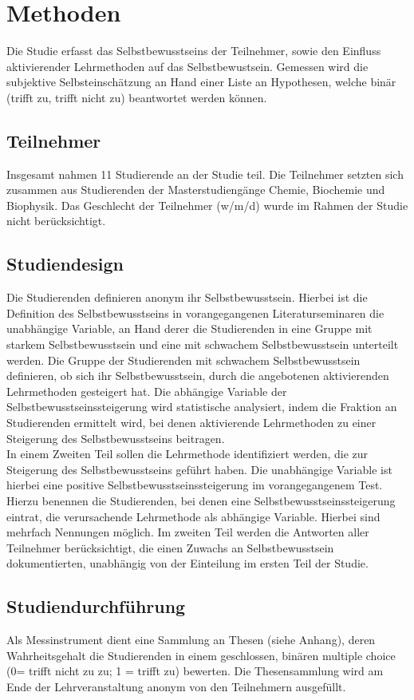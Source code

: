 \section{Methoden}
Die Studie erfasst das Selbstbewusstseins der Teilnehmer, sowie den Einfluss aktivierender Lehrmethoden auf das Selbstbewustsein. Gemessen wird die subjektive Selbsteinschätzung an Hand einer Liste an Hypothesen, welche binär (trifft zu, trifft nicht zu) beantwortet werden können.

\subsection{Teilnehmer}
Insgesamt nahmen 11 Studierende an der Studie teil. Die Teilnehmer setzten sich zusammen aus Studierenden der Masterstudiengänge Chemie, Biochemie und Biophysik. Das Geschlecht der Teilnehmer (w/m/d) wurde im Rahmen der Studie nicht berücksichtigt.

\subsection{Studiendesign}
Die Studierenden definieren anonym ihr Selbstbewusstsein. Hierbei ist die Definition des Selbstbewusstseins in vorangegangenen Literaturseminaren die unabhängige Variable, an Hand derer die Studierenden in eine Gruppe mit starkem Selbstbewusstsein und eine mit schwachem Selbstbewusstsein unterteilt werden. Die Gruppe der Studierenden mit schwachem Selbstbewusstsein definieren, ob sich ihr Selbstbewusstsein, durch die angebotenen aktivierenden Lehrmethoden gesteigert hat. Die abhängige Variable der Selbstbewusstseinssteigerung wird statistische analysiert, indem die Fraktion an Studierenden ermittelt wird, bei denen aktivierende Lehrmethoden zu einer Steigerung des Selbstbewusstseins beitragen.\\
\noindent
In einem Zweiten Teil sollen die Lehrmethode identifiziert werden, die zur Steigerung des Selbstbewusstseins geführt haben. Die unabhängige Variable ist hierbei eine positive Selbstbewusstseinssteigerung im vorangegangenem Test. Hierzu benennen die Studierenden, bei denen eine Selbstbewusstseinssteigerung eintrat, die verursachende Lehrmethode als abhängige Variable. Hierbei sind mehrfach Nennungen möglich. Im zweiten Teil werden die Antworten aller Teilnehmer berücksichtigt, die einen Zuwachs an Selbstbewusstsein dokumentierten, unabhängig von der Einteilung im ersten Teil der Studie.


\subsection{Studiendurchführung}
Als Messinstrument dient eine Sammlung an Thesen (siehe Anhang), deren Wahrheitsgehalt die Studierenden in einem geschlossen, binären multiple choice (0= trifft nicht zu zu; 1 = trifft zu) bewerten. Die Thesensammlung wird am Ende der Lehrveranstaltung anonym von den Teilnehmern ausgefüllt.

